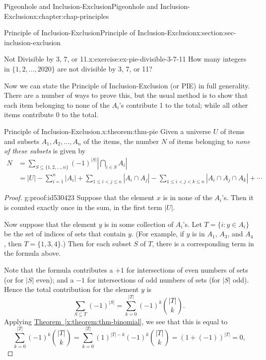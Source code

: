 \documentclass[oneside,10pt,]{book}
\newcommand{\xreffont}{\relax}
\numberwithin{equation}{section}
\newcommand{\lt}{<}
\newcommand{\amp}{&}
\begin{document}
\begin{chapterptx}{Pigeonhole and Inclusion-Exclusion}{}{Pigeonhole and Inclusion-Exclusion}{}{}{x:chapter:chap-principles}
\begin{sectionptx}{Principle of Inclusion-Exclusion}{}{Principle of Inclusion-Exclusion}{}{}{x:section:sec-inclusion-exclusion}
%
\begin{inlineexercise}{Not Divisible by 3, 7, or 11.}{x:exercise:ex-pie-divisible-3-7-11}%
How many integers in \(\{1,2,\ldots,2020\}\) are not divisible by 3, 7, or 11?%
\end{inlineexercise}%
Now we can state the Principle of Inclusion-Exclusion (or PIE) in full generality. There are a number of ways to prove this, but the usual method is to show that each item belonging to none of the \(A_i\)'s contribute 1 to the total; while all other items contribute 0 to the total.%
\begin{theorem}{Principle of Inclusion-Exclusion.}{}{x:theorem:thm-pie}%
Given a universe \(U\) of items and subsets \(A_1,A_2,\ldots,A_n\) of the items, the number \(N\) of items belonging to \emph{none of these subsets} is given by%
\begin{align*}
N \amp = \sum_{S \subseteq \{1,2,\ldots,n\}} (-1)^{|S|} \left| \bigcap_{i\in S} A_i\right|\\
\amp  = |U| - \sum_{i = 1}^n |A_i| + \sum_{1 \leq i \lt j \leq n} |A_i \cap A_j| - \sum_{1 \leq i \lt j \lt k \leq n} |A_i \cap A_j \cap A_k| + \cdots 
\end{align*}
%
\end{theorem}
\begin{proof}{}{g:proof:id530423}
Suppose that the element \(x\) is in none of the \(A_i\)'s. Then it is counted exactly once in the sum, in the first term \(|U|\).%
\par
Now suppose that the element \(y\) is in some collection of \(A_i\)'s. Let \(T = \{i : y \in A_i\}\) be the set of indices of sets that contain \(y\). (For example, if \(y\) is in \(A_1\), \(A_3\), and \(A_4\), then \(T = \{1,3,4\}\).) Then for each subset \(S\) of \(T\), there is a corresponding term in the formula above.%
\par
Note that the formula contributes a \(+1\) for intersections of even numbers of sets (or for \(|S|\) even); and a \(-1\) for intersections of odd numbers of sets (for \(|S|\) odd). Hence the total contribution for the element \(y\) is%
\begin{equation*}
\sum_{S \subseteq T} (-1)^{|S|} = \sum_{k=0}^{|T|} (-1)^k\binom{|T|}{k}\text{.}
\end{equation*}
Applying \hyperref[x:theorem:thm-binomial]{Theorem~{\xreffont\ref{x:theorem:thm-binomial}}}, we see that this is equal to%
\begin{equation*}
\sum_{k=0}^{|T|} (-1)^k\binom{|T|}{k} = \sum_{k=0}^{|T|} (1)^{|T|-k}(-1)^k\binom{|T|}{k} = \left( 1 + (-1) \right)^{|T|} = 0\text{,}

\end{equation*}
\end{proof}
\end{sectionptx}
\end{chapterptx}
\end{document}
